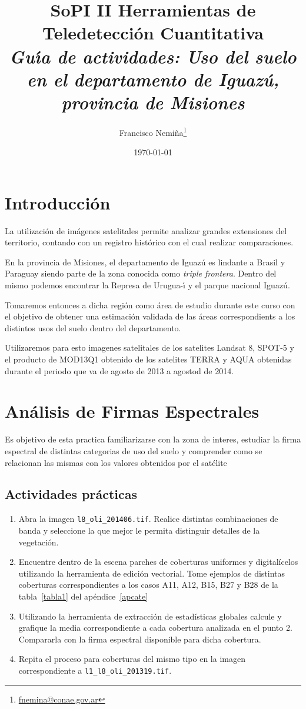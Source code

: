 \documentclass[hidelinks,12pt]{article}
\title{SoPI II \- Herramientas de Teledetecci\'on Cuantitativa \\ 
\emph{Gu\'{\i}a de actividades: Uso del suelo en el departamento de Iguaz\'u,
provincia de Misiones}}
\author{Francisco
Nemi\~na\thanks{\href{mailto:fnemina@conae.govar}{fnemina@conae.gov.ar}}}
\affil{Unidad de Educaci\'on y Formaci\'on Masiva\\ 
    Comisi\'on Nacional de Actividades Espaciales}
\date{\today}
\begin{document}
\maketitle

\section*{Introducci\'on}

La utilización de imágenes satelitales permite analizar grandes extensiones del
territorio, contando con un registro histórico con el cual realizar
comparaciones.

En la provincia de Misiones, el departamento de Iguaz\'u es lindante a Brasil y 
Paraguay siendo parte de la zona conocida como \emph{triple frontera}. Dentro del 
mismo podemos encontrar la Represa de Urugua-\'{\i} y el parque nacional
Iguaz\'u.

Tomaremos entonces a dicha regi\'on como \'area de estudio durante este curso
con el objetivo de obtener una estimaci\'on validada de las \'areas
correspondients a los distintos usos del suelo dentro del departamento.

Utilizaremos para esto imagenes satelitales de los satelites Landsat 8, SPOT-5 y
el producto de MOD13Q1 obtenido de los satelites TERRA y AQUA obtenidas durante el
periodo que va de agosto de 2013 a agostod de 2014. 

\newpage
\section{Análisis de Firmas Espectrales}
Es objetivo de esta practica familiarizarse con la zona de interes, estudiar la
firma espectral de distintas categorias de uso del suelo y comprender como se
relacionan las mismas con los valores obtenidos por el sat\'elite

\subsection{Actividades pr\'acticas}
\begin{enumerate}
    \item Abra la imagen \texttt{l8\_oli\_2014\-06.tif}. Realice distintas
        combinaciones de banda y seleccione la que mejor le permita distinguir 
        detalles de la vegetación.
    \item Encuentre dentro de la escena parches de coberturas uniformes y 
        digitalícelos utilizando la herramienta de edición vectorial. Tome
        ejemplos de distintas coberturas correspondientes a los casos A11, A12,
        B15, B27 y B28 de la tabla~\ref{tabla1} del ap\'endice~\ref{apcate}
    \item Utilizando la herramienta de extracción de estadísticas globales
        calcule y grafique la media correspondiente a cada cobertura analizada 
        en el punto 2. Compararla con la firma espectral disponible para dicha
        cobertura.
    \item Repita el proceso para coberturas del mismo tipo en la imagen 
        correspondiente a \texttt{l1\_l8\_oli\_2013\-19.tif}.
\end{enumerate}
\end{document}
